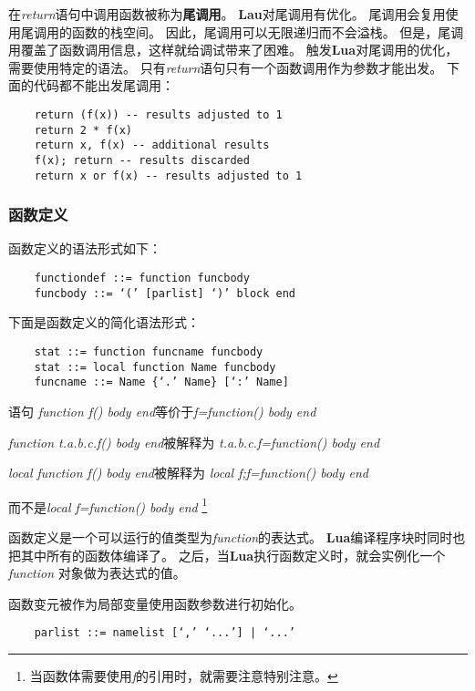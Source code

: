 \documentclass{ctexart}
\begin{document}
在\emph{return}语句中调用函数被称为\textbf{尾调用}。
\textbf{Lau}对尾调用有优化。
尾调用会复用使用尾调用的函数的栈空间。
因此，尾调用可以无限递归而不会溢栈。
但是，尾调用覆盖了函数调用信息，这样就给调试带来了困难。
触发\textbf{Lua}对尾调用的优化，需要使用特定的语法。
只有\emph{return}语句只有一个函数调用作为参数才能出发。
下面的代码都不能出发尾调用：

\lstset{language=C}
\begin{lstlisting}
	return (f(x)) -- results adjusted to 1
	return 2 * f(x)
	return x, f(x) -- additional results
	f(x); return -- results discarded
	return x or f(x) -- results adjusted to 1
\end{lstlisting}

\subsubsection{函数定义}

函数定义的语法形式如下：

\lstset{language=C}
\begin{lstlisting}
	functiondef ::= function funcbody
	funcbody ::= ‘(’ [parlist] ‘)’ block end
\end{lstlisting}

下面是函数定义的简化语法形式：

\lstset{language=C}
\begin{lstlisting}
	stat ::= function funcname funcbody
	stat ::= local function Name funcbody
	funcname ::= Name {‘.’ Name} [‘:’ Name]
\end{lstlisting}

语句
\emph{function f() body end}等价于\emph{f=function() body end}

\emph{function t.a.b.c.f() body end}被解释为
\emph{t.a.b.c.f=function() body end}

\emph{local function f() body end}被解释为
\emph{local f;f=function() body end}

而不是\emph{local f=function() body end}
\footnote{当函数体需要使用\emph{f}的引用时，就需要注意特别注意。}

函数定义是一个可以运行的值类型为\emph{function}的表达式。
\textbf{Lua}编译程序块时同时也把其中所有的函数体编译了。
之后，当\textbf{Lua}执行函数定义时，就会实例化一个\emph{function}
对象做为表达式的值。

函数变元被作为局部变量使用函数参数进行初始化。

\lstset{language=C}
\begin{lstlisting}
	parlist ::= namelist [‘,’ ‘...’] | ‘...’
\end{lstlisting}
\end{document}
